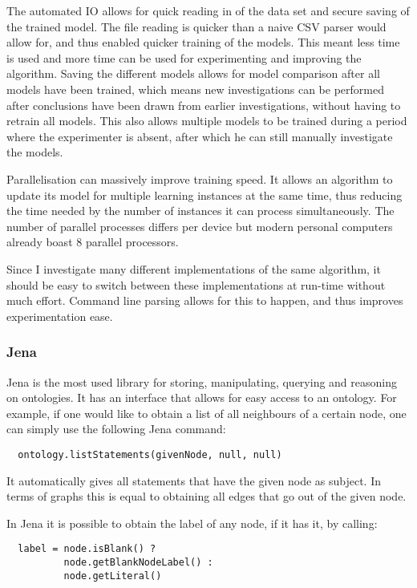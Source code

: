 \documentclass{article}
\begin{document}
 The automated IO allows for quick reading in of the data set and secure saving of the trained model. The file reading is quicker than a naive CSV parser would allow for, and thus enabled quicker training of the models. This meant less time is used and more time can be used for experimenting and improving the algorithm. Saving the different models allows for model comparison after all models have been trained, which means new investigations can be performed after conclusions have been drawn from earlier investigations, without having to retrain all models. This also allows multiple models to be trained during a period where the experimenter is absent, after which he can still manually investigate the models.
 
 Parallelisation can massively improve training speed. It allows an algorithm to update its model for multiple learning instances at the same time, thus reducing the time needed by the number of instances it can process simultaneously. The number of parallel processes differs per device but modern personal computers already boast 8 parallel processors.
 
 Since I investigate many different implementations of the same algorithm, it should be easy to switch between these implementations at run-time without much effort. Command line parsing allows for this to happen, and thus improves experimentation ease.
 
 \subsubsection{Jena}
 Jena is the most used library for storing, manipulating, querying and reasoning on ontologies\cite{jena}. It has an interface that allows for easy access to an ontology. For example, if one would like to obtain a list of all neighbours of a certain node, one can simply use the following Jena command:
 \lstset{language=Java}
 \begin{lstlisting}
  ontology.listStatements(givenNode, null, null)
 \end{lstlisting}
 
 It automatically gives all statements that have the given node as subject. In terms of graphs this is equal to obtaining all edges that go out of the given node.
 
 In Jena it is possible to obtain the label of any node, if it has it, by calling:
 
 \lstset{language=Java}
 \begin{lstlisting}
  label = node.isBlank() ? 
  		  node.getBlankNodeLabel() : 
  		  node.getLiteral()
 \end{lstlisting}
 
\end{document}

